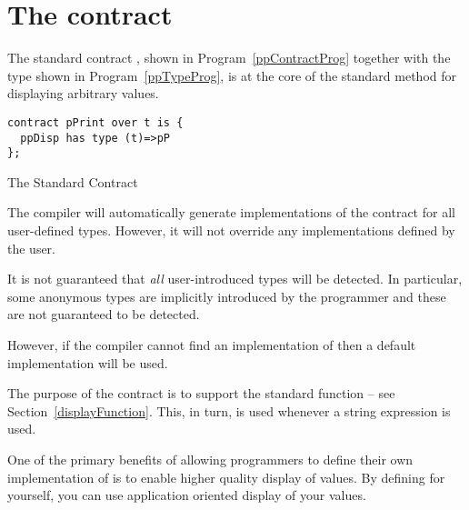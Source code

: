 \section{The  contract}
\label{pPrintContract}

The standard contract , shown in Program~\vref{ppContractProg} together with the  type shown in Program~\vref{ppTypeProg}, is at the core of the standard method for displaying arbitrary values. 
\begin{program}
\begin{lstlisting}
contract pPrint over t is {
  ppDisp has type (t)=>pP
};
\end{lstlisting}
\caption{The Standard  Contract}\label{ppContractProg}
\end{program}
The \Sr compiler will automatically generate implementations of the  contract for all user-defined types. However, it will not override any implementations defined by the user.
\begin{aside}
It is not guaranteed that \emph{all} user-introduced types will be detected. In particular, some anonymous types are implicitly introduced by the programmer and these are not guaranteed to be detected.

However, if the compiler cannot find an implementation of  then a default implementation will be used.
\end{aside}

The purpose of the  contract is to support the standard  function -- see Section~\vref{displayFunction}. This, in turn, is used whenever a string  expression is used.

\begin{aside}
One of the primary benefits of allowing programmers to define their own implementation of  is to enable higher quality display of values. By defining  for yourself, you can use application oriented display of your values.
\end{aside}


